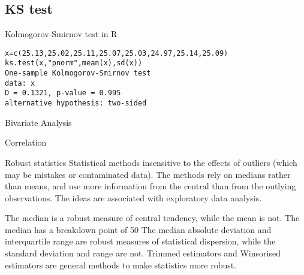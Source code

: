 \documentclass[12pt, a4paper]{article}
\begin{document}
\subsection{KS test}


Kolmogorov-Smirnov test in R
\begin{verbatim}
x=c(25.13,25.02,25.11,25.07,25.03,24.97,25.14,25.09)
ks.test(x,"pnorm",mean(x),sd(x))
One-sample Kolmogorov-Smirnov test
data: x
D = 0.1321, p-value = 0.995
alternative hypothesis: two-sided
\end{verbatim}


Bivariate Analysis

Correlation


\newpage
Robust statistics Statistical methods insensitive to the effects of outliers (which may be mistakes or contaminated data). The methods rely on medians rather than means, and use more information from the central than from the outlying observations. The ideas are associated with exploratory data analysis.

The median is a robust measure of central tendency, while the mean is not. The median has a breakdown point of 50%
The median absolute deviation and interquartile range are robust measures of statistical dispersion, while the standard deviation and range are not.
Trimmed estimators and Winsorised estimators are general methods to make statistics more robust. 
\end{document}
